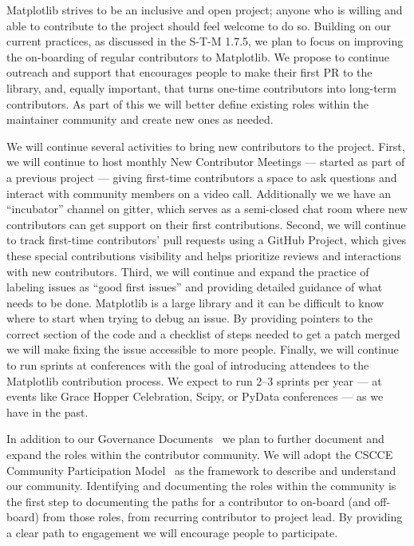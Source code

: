 \documentclass[12pt]{article}
\numberwithin{page}{section}
\begin{document}
Matplotlib strives to be an inclusive and open project; anyone who is willing
and able to contribute to the project should feel welcome to do so.  Building on
our current practices, as discussed in the S-T-M 1.7.5, we plan to focus
on improving the on-boarding of regular contributors to Matplotlib.  We propose
to continue outreach and support that encourages people to make their first PR to
the library, and, equally important, that turns one-time contributors into
long-term contributors.  As part of this we will better define existing roles
within the maintainer community
and create new ones as needed.

We will continue several activities to bring new contributors to the project.
First, we will continue to host monthly New Contributor Meetings --- started
as part of a previous project --- giving first-time contributors a space to ask
questions and interact with community members on a video call.  Additionally we
we have an ``incubator'' channel on gitter, which serves as a semi-closed chat
room where new contributors can get support on their first contributions.
Second, we will continue to track
first-time contributors' pull requests using a GitHub Project, which gives
these special contributions visibility and helps prioritize reviews and
interactions with new contributors. Third, we will continue and expand the
practice of labeling issues as ``good first issues'' and providing detailed
guidance of what needs to be done.  Matplotlib is a large library and it can be
difficult to know where to start when trying to debug an issue.  By providing
pointers to the correct section of the code and a checklist of steps needed to get a
patch merged we will make fixing the issue accessible to more people.  Finally,
we will continue to run sprints at conferences with the goal of introducing
attendees to the Matplotlib contribution process.  We expect to run 2--3
sprints per year --- at events like Grace Hopper Celebration, Scipy, or PyData
conferences --- as we have in the past.

In addition to our Governance Documents~\cite{gov} we plan to further document
and expand the roles within the contributor community.  We will adopt the CSCCE
Community Participation Model~\cite{cscce:cpm} as the framework to describe and
understand our community.  Identifying and documenting the roles within the
community is the first step to documenting the paths for a contributor to
on-board (and off-board) from those roles, from recurring contributor to
project lead.  By providing a clear path to engagement we will encourage
people to participate.
\end{document}
